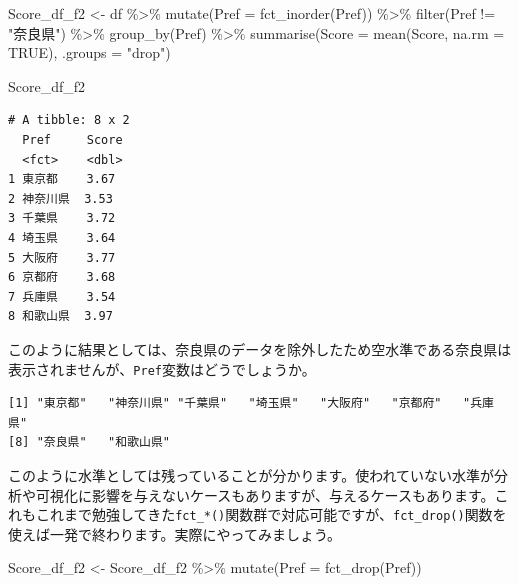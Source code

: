 \documentclass[
  a4paper,
  pandoc,
  ja=standard,
  jafont=haranoaji]{bxjsbook}
\newenvironment{Shaded}{\begin{snugshade}}{\end{snugshade}}
\newcommand{\AttributeTok}[1]{\textcolor[rgb]{0.00,0.48,0.65}{#1}}
\newcommand{\ConstantTok}[1]{\textcolor[rgb]{0.56,0.35,0.01}{#1}}
\newcommand{\FunctionTok}[1]{\textcolor[rgb]{0.28,0.35,0.67}{#1}}
\newcommand{\NormalTok}[1]{\textcolor[rgb]{0.00,0.48,0.65}{#1}}
\newcommand{\OtherTok}[1]{\textcolor[rgb]{0.00,0.48,0.65}{#1}}
\newcommand{\SpecialCharTok}[1]{\textcolor[rgb]{0.37,0.37,0.37}{#1}}
\newcommand{\StringTok}[1]{\textcolor[rgb]{0.13,0.47,0.30}{#1}}
\begin{document}
\begin{Shaded}
\begin{Highlighting}[numbers=left,,]
\NormalTok{Score\_df\_f2 }\OtherTok{\textless{}{-}}\NormalTok{ df }\SpecialCharTok{\%\textgreater{}\%}
  \FunctionTok{mutate}\NormalTok{(}\AttributeTok{Pref =} \FunctionTok{fct\_inorder}\NormalTok{(Pref)) }\SpecialCharTok{\%\textgreater{}\%}
  \FunctionTok{filter}\NormalTok{(Pref }\SpecialCharTok{!=} \StringTok{"奈良県"}\NormalTok{) }\SpecialCharTok{\%\textgreater{}\%}
  \FunctionTok{group\_by}\NormalTok{(Pref) }\SpecialCharTok{\%\textgreater{}\%}
  \FunctionTok{summarise}\NormalTok{(}\AttributeTok{Score   =} \FunctionTok{mean}\NormalTok{(Score, }\AttributeTok{na.rm =} \ConstantTok{TRUE}\NormalTok{),}
            \AttributeTok{.groups =} \StringTok{"drop"}\NormalTok{)}

\NormalTok{Score\_df\_f2}
\end{Highlighting}
\end{Shaded}

\begin{verbatim}
# A tibble: 8 x 2
  Pref     Score
  <fct>    <dbl>
1 東京都    3.67
2 神奈川県  3.53
3 千葉県    3.72
4 埼玉県    3.64
5 大阪府    3.77
6 京都府    3.68
7 兵庫県    3.54
8 和歌山県  3.97
\end{verbatim}

このように結果としては、奈良県のデータを除外したため空水準である奈良県は表示されませんが、\texttt{Pref}変数はどうでしょうか。

\begin{Shaded}
\end{Shaded}

\begin{verbatim}
[1] "東京都"   "神奈川県" "千葉県"   "埼玉県"   "大阪府"   "京都府"   "兵庫県"  
[8] "奈良県"   "和歌山県"
\end{verbatim}

このように水準としては残っていることが分かります。使われていない水準が分析や可視化に影響を与えないケースもありますが、与えるケースもあります。これもこれまで勉強してきた\texttt{fct\_*()}関数群で対応可能ですが、\texttt{fct\_drop()}関数を使えば一発で終わります。実際にやってみましょう。

\begin{Shaded}
\begin{Highlighting}[numbers=left,,]
\NormalTok{Score\_df\_f2 }\OtherTok{\textless{}{-}}\NormalTok{ Score\_df\_f2 }\SpecialCharTok{\%\textgreater{}\%}
  \FunctionTok{mutate}\NormalTok{(}\AttributeTok{Pref =} \FunctionTok{fct\_drop}\NormalTok{(Pref))}
\end{Highlighting}
\end{Shaded}
\end{document}
